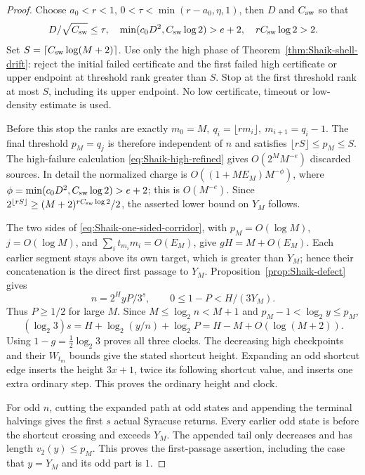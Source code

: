 \begin{proof}
Choose \(a_0<r<1\), \(0<\tau<\min(r-a_0,\eta,1)\), then \(D\)
and \(C_{\rm sw}\) so that
\[
 D/\sqrt{C_{\rm sw}}\le\tau,\quad
 \min(c_0D^2,C_{\rm sw}\log2)>e+2,\quad
 rC_{\rm sw}\log2>2.
\]
Set \(S=\lceil C_{\rm sw}\log(M+2)\rceil\). Use only the high
phase of Theorem~\ref{thm:Shaik-shell-drift}: reject the initial
failed certificate and the first failed high certificate or upper
endpoint at threshold rank greater than \(S\). Stop at the first
threshold rank at most \(S\), including its upper endpoint.
No low certificate, timeout or low-density estimate is used.

Before this stop the ranks are exactly
\(m_0=M,\ q_i=\lfloor rm_i\rfloor,\ m_{i+1}=q_i-1\).
The final threshold \(p_M=q_j\) is therefore independent of \(n\)
and satisfies \(\lfloor rS\rfloor\le p_M\le S\).
The high-failure calculation \eqref{eq:Shaik-high-refined} gives
\(O(2^M M^{-e})\) discarded sources. In detail the normalized
charge is \(O((1+ME_M)M^{-\phi})\), where
\(\phi=\min(c_0D^2,C_{\rm sw}\log2)>e+2\); this is \(O(M^{-e})\).
Since \(2^{\lfloor rS\rfloor}\ge (M+2)^{rC_{\rm sw}\log2}/2\),
the asserted lower bound on \(Y_M\) follows.

The two sides of \eqref{eq:Shaik-one-sided-corridor}, with
\(p_M=O(\log M)\), \(j=O(\log M)\), and
\(\sum_i t_{m_i}m_i=O(E_M)\), give \(gH=M+O(E_M)\).
Each earlier segment stays above its own target, which is greater
than \(Y_M\); hence their concatenation is the direct first passage
to \(Y_M\). Proposition~\ref{prop:Shaik-defect} gives
\[
 n=2^HyP/3^s,\qquad 0\le1-P<H/(3Y_M).
\]
Thus \(P\ge1/2\) for large \(M\). Since
\(M\le\log_2n<M+1\) and \(p_M-1<\log_2y\le p_M\),
\[
 (\log_2 3)s=H+\log_2(y/n)+\log_2P
            =H-M+O(\log(M+2)).
\]
Using \(1-g=\tfrac12\log_2 3\) proves all three clocks.
The decreasing high checkpoints and their \(W_{t_m}\) bounds give
the stated shortcut height. Expanding an odd shortcut edge inserts
the height \(3x+1\), twice its following shortcut value, and inserts
one extra ordinary step. This proves the ordinary height and clock.

For odd \(n\), cutting the expanded path at odd states and appending
the terminal halvings gives the first \(s\) actual Syracuse returns.
Every earlier odd state is before the shortcut crossing and exceeds
\(Y_M\). The appended tail only decreases and has length
\(v_2(y)\le p_M\). This proves the first-passage assertion, including
the case that \(y=Y_M\) and its odd part is \(1\).
\end{proof}

